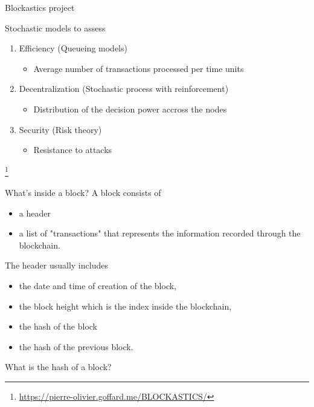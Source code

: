 \documentclass{beamer}
\newcommand\blfootnote[1]{%
  \begingroup
  \renewcommand\thefootnote{}\footnote{#1}%
  \addtocounter{footnote}{-1}%
  \endgroup
}
\begin{document}
\begin{frame}{Blockastics project}

Stochastic models to assess
\medskip
\begin{enumerate}
  \item Efficiency (Queueing models)
  \begin{itemize}
    \item Average number of transactions processed per time units
  \end{itemize}
  \medskip
  \item Decentralization (Stochastic process with reinforcement)
  \begin{itemize}
    \item Distribution of the decision power accross the nodes
  \end{itemize}
  \medskip
  \item Security (Risk theory)
  \begin{itemize}
    \item Resistance to attacks
  \end{itemize}
\end{enumerate}
\blfootnote{\href{https://pierre-olivier.goffard.me/BLOCKASTICS/}{https://pierre-olivier.goffard.me/BLOCKASTICS/}}
\end{frame}


\begin{frame}{What's inside a block?}
A block consists of 
\begin{itemize}
\item a header 
\item a list of "transactions" that represents the information recorded through the blockchain. 
\end{itemize}
The header usually includes 
\begin{itemize}
\item the date and time of creation of the block, 
\item the block height which is the index inside the blockchain, 
\item the hash of the block 
\item the hash of the previous block. 
\end{itemize}
\begin{tcolorbox}[enhanced,drop shadow, title=Question]
What is the hash of a block?
\end{tcolorbox}
\end{frame}
\end{document}
